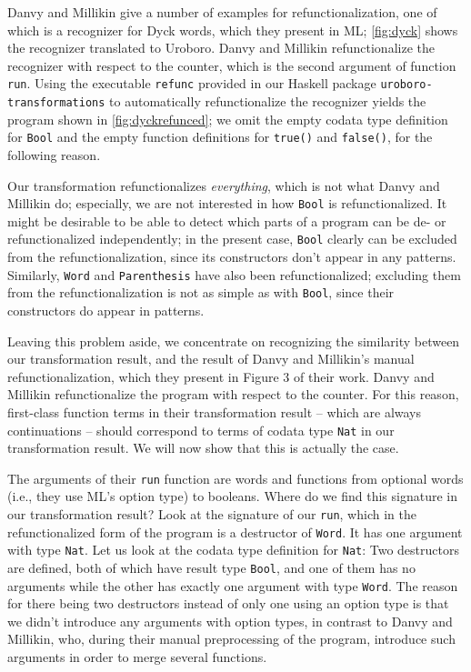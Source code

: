 Danvy and Millikin\cite{danvy09refunctionalization} give a number of examples for refunctionalization, one of which is a recognizer for Dyck words, which they present in ML; \autoref{fig:dyck} shows the recognizer translated to Uroboro. Danvy and Millikin refunctionalize the recognizer with respect to the counter, which is the second argument of function \texttt{run}. Using the executable \texttt{refunc} provided in our Haskell package \texttt{uroboro-transformations} to automatically refunctionalize the recognizer yields the program shown in \autoref{fig:dyckrefunced}; we omit the empty codata type definition for \texttt{Bool} and the empty function definitions for \texttt{true()} and \texttt{false()}, for the following reason.

Our transformation refunctionalizes \textit{everything}, which is not what Danvy and Millikin do; especially, we are not interested in how \texttt{Bool} is refunctionalized. It might be desirable to be able to detect which parts of a program can be de- or refunctionalized independently; in the present case, \texttt{Bool} clearly can be excluded from the refunctionalization, since its constructors don't appear in any patterns. Similarly, \texttt{Word} and \texttt{Parenthesis} have also been refunctionalized; excluding them from the refunctionalization is not as simple as with \texttt{Bool}, since their constructors do appear in patterns.

Leaving this problem aside, we concentrate on recognizing the similarity between our transformation result, and the result of Danvy and Millikin's manual refunctionalization, which they present in Figure 3 of their work. Danvy and Millikin refunctionalize the program with respect to the counter. For this reason, first-class function terms in their transformation result -- which are always continuations -- should correspond to terms of codata type \texttt{Nat} in our transformation result. We will now show that this is actually the case.

The arguments of their \texttt{run} function are words and functions from optional words  (i.e., they use ML's option type) to booleans. Where do we find this signature in our transformation result? Look at the signature of our \texttt{run}, which in the refunctionalized form of the program is a destructor of \texttt{Word}. It has one argument with type \texttt{Nat}. Let us look at the codata type definition for \texttt{Nat}: Two destructors are defined, both of which have result type \texttt{Bool}, and one of them has no arguments while the other has exactly one argument with type \texttt{Word}. The reason for there being two destructors instead of only one using an option type is that we didn't introduce any arguments with option types, in contrast to Danvy and Millikin, who, during their manual preprocessing of the program, introduce such arguments in order to merge several functions.

